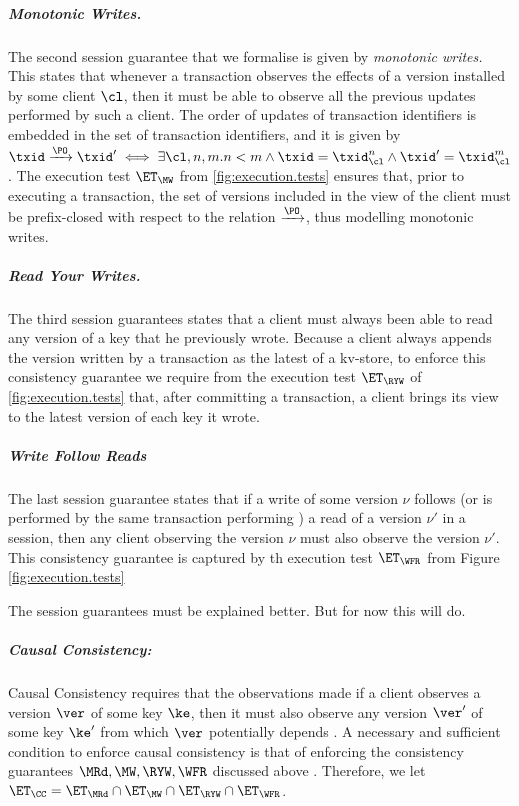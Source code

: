 \subparagraph{Monotonic Writes.}
The second session guarantee that we formalise is given by \emph{monotonic writes.} This states that 
whenever a transaction observes the effects of a version installed by some client $\cl$, then 
it must be able to observe all the previous updates performed by such a client. 
The order of updates of transaction identifiers is embedded in the set of transaction identifiers, 
and it is given by $\txid \xrightarrow{\PO} \txid' \iff \exists \cl, n,m. n < m \wedge \txid = \txid_{\cl}^{n} \wedge 
\txid' = \txid_{\cl}^{m}$. The execution test $\ET_{\MW}$ from \cref{fig:execution.tests} ensures 
that, prior to executing a transaction, the set of versions included in the view of the client 
must be prefix-closed with respect to the relation $\xrightarrow{\PO}$, thus modelling 
monotonic writes.

\subparagraph{Read Your Writes.}
The third session guarantees states that a client must always been able to read any version 
of a key that he previously wrote. Because a client always appends the version written by  
a transaction as the latest of a kv-store, to enforce this consistency guarantee we require from 
the execution test $\ET_{\RYW}$ of \cref{fig:execution.tests} that, after committing a transaction, 
a client brings its view to the latest version of each key it wrote.  

\subparagraph{Write Follow Reads}
The last session guarantee states that if a write of some version $\nu$ follows (or is performed by the same transaction performing ) 
a read of a version $\nu'$ in a session, 
then any client observing the version $\nu$ must also observe the version $\nu'$. This consistency guarantee is 
captured by th execution test $\ET_{\WFR}$ from Figure \cref{fig:execution.tests}

\ac{The session guarantees must be explained better. But for now this will do.}

\subparagraph{Causal Consistency: }
Causal Consistency requires that the observations made if a client observes a version 
$\ver$ of some key $\ke$, then it must also observe any version $\ver'$ of some key $\ke'$ 
from which $\ver$ potentially depends \cite{cops}. A necessary and sufficient condition to enforce 
causal consistency is that of enforcing the consistency guarantees $\MRd, \MW, \RYW, \WFR$ 
discussed above \cite{session2causal}. Therefore, we let $\ET_{\CC} = \ET_{\MRd} \cap \ET_{\MW} 
\cap \ET_{\RYW} \cap \ET_{\WFR}$.

